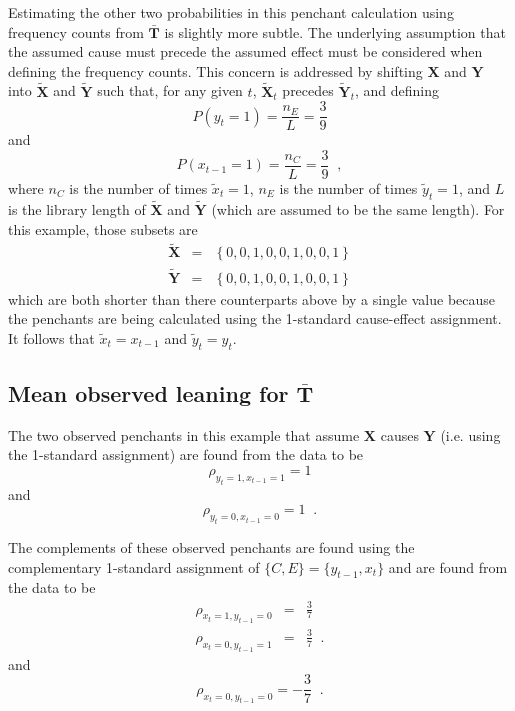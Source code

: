 \documentclass[a4paper,11pt,twocolumn]{article}
\begin{document}
Estimating the other two probabilities in this penchant calculation using frequency counts from $\bar{\mathbf{T}}$ is slightly more subtle.  The underlying assumption that the assumed cause must precede the assumed effect must be considered when defining the frequency counts.  This concern is addressed by shifting $\mathbf{X}$ and $\mathbf{Y}$ into $\tilde{\mathbf{X}}$ and $\tilde{\mathbf{Y}}$ such that, for any given $t$, $\tilde{\mathbf{X}}_t$ precedes $\tilde{\mathbf{Y}}_t$, and defining 
\begin{equation}
P\left( y_t = 1\right) = \frac{n_E}{L} = \frac{3}{9}
\end{equation}
and
\begin{equation}
P\left( x_{t-1} = 1\right) = \frac{n_C}{L} = \frac{3}{9}\;\;,
\end{equation}
where $n_C$ is the number of times $\tilde{x}_t = 1$, $n_E$ is the number of times $\tilde{y}_t = 1$, and $L$ is the library length of $\tilde{\mathbf{X}}$ and $\tilde{\mathbf{Y}}$ (which are assumed to be the same length).  For this example, those subsets are
\begin{eqnarray*}
\tilde{\mathbf{X}} &=& \left\{0,0,1,0,0,1,0,0,1\right\}\\
\tilde{\mathbf{Y}} &=& \left\{0,0,1,0,0,1,0,0,1\right\}
\end{eqnarray*}
which are both shorter than there counterparts above by a single value because the penchants are being calculated using the 1-standard cause-effect assignment.  It follows that $\tilde{x}_t = x_{t-1}$ and $\tilde{y}_t=y_t$.  

\subsection{Mean observed leaning for $\bar{\mathbf{T}}$}
The two observed penchants in this example that assume $\mathbf{X}$ causes $\mathbf{Y}$ (i.e. using the 1-standard assignment) are found from the data to be
\begin{equation}
\label{eqn:rhoex1}
\rho_{y_t=1,x_{t-1}=1}=1
\end{equation}
and
\begin{equation}
\rho_{y_t=0,x_{t-1}=0}=1\;\;.
\end{equation}

The complements of these observed penchants are found using the complementary 1-standard assignment of $\{C,E\}=\{y_{t-1},x_t\}$ and are found from the data to be
\begin{eqnarray}
\rho_{x_t=1,y_{t-1}=0} &=& \frac{3}{7}\\
\rho_{x_t=0,y_{t-1}=1} &=& \frac{3}{7}\;\;.
\end{eqnarray}
and
\begin{equation}
\rho_{x_t=0,y_{t-1}=0}=-\frac{3}{7}\;\;.
\end{equation}
\end{document}
